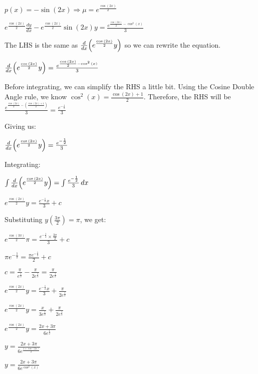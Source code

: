 \documentclass[../main.tex]{subfiles}
\begin{document}
\begin{enumerate}[itemsep=0.7cm]
    $p(x)=-\sin{(2x)} \Rightarrow \mu=e^{\frac{\cos{(2x)}}{2}}$

    $e^{\frac{\cos{(2x)}}{2}}\frac{dy}{dx}-e^{\frac{\cos{(2x)}}{2}}\sin{(2x)}y=\frac{e^{\frac{\cos{(2x)}}{2}-\cos^2{(x)}}}{3}$

    The LHS is the same as $\frac{d}{dx}\Bigl(e^{\frac{\cos{(2x)}}{2}}y\Bigr)$ so we can rewrite the equation.

    $\frac{d}{dx}\Bigl(e^{\frac{\cos{(2x)}}{2}}y\Bigr)=\frac{e^{\frac{\cos{(2x)}}{2}-\cos^2{(x)}}}{3}$

    Before integrating, we can simplify the RHS a little bit. Using the Cosine Double Angle rule, we know $\cos^2{(x)}=\frac{\cos{(2x)}+1}{2}$. Therefore, the RHS will be $\frac{e^{\frac{\cos{(2x)}}{2}-(\frac{\cos{(2x)}+1}{2})}}{3}=\frac{e^{-\frac{1}{2}}}{3}$

    Giving us:

    $\frac{d}{dx}\Bigl(e^{\frac{\cos{(2x)}}{2}}y\Bigr)=\frac{e^{-\frac{1}{2}}}{3}$

    Integrating:

    $\int \frac{d}{dx}\Bigl(e^{\frac{\cos{(2x)}}{2}}y\Bigr)=\int \frac{e^{-\frac{1}{2}}}{3}\,dx$

    $e^{\frac{\cos{(2x)}}{2}}y=\frac{e^{-\frac{1}{2}}x}{3}+c$
    
    Substituting $y(\frac{3\pi}{2})=\pi$, we get:

    $e^{\frac{\cos{(3\pi)}}{2}}\pi=\frac{e^{-\frac{1}{2}}\times \frac{3\pi}{2}}{3}+c$

    $\pi e^{-\frac{1}{2}}=\frac{\pi e^{-\frac{1}{2}}}{2}+c$

    $c=\frac{\pi}{e^{\frac{1}{2}}}-\frac{\pi}{2e^{\frac{1}{2}}}=\frac{\pi}{2e^{\frac{1}{2}}}$

    $e^{\frac{\cos{(2x)}}{2}}y=\frac{e^{-\frac{1}{2}}x}{3}+\frac{\pi}{2e^{\frac{1}{2}}}$

    $e^{\frac{\cos{(2x)}}{2}}y=\frac{x}{3e^{\frac{1}{2}}}+\frac{\pi}{2e^{\frac{1}{2}}}$

    $e^{\frac{\cos{(2x)}}{2}}y=\frac{2x+3\pi}{6e^{\frac{1}{2}}}$

    $y=\frac{2x+3\pi}{6e^{\frac{1+\cos{(2x)}}{2}}}$

    $y=\frac{2x+3\pi}{6e^{\cos^2{(x)}}}$

\end{enumerate}
\end{document}

